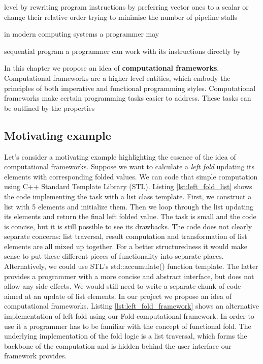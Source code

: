 level by rewriting program instructions by preferring vector ones to a scalar or change their relative order trying to minimise the number of pipeline stalls    

in modern computing systems a programmer may 

sequential program a programmer can work with its instructions directly by 

\quad In this chapter we propose an idea of \textbf{computational frameworks}. Computational frameworks are a higher level entities, which embody the principles of both imperative and functional programming styles. Computational frameworks make certain programming tasks easier to address. These tasks can be outlined by the properties 

\subsection{Motivating example}
\quad Let's consider a motivating example highlighting the essence of the idea of computational frameworks. Suppose we want to calculate a \textit{left fold} updating its elements with corresponding folded values.\newline\null
\quad We can code that simple computation using C++ Standard Template Library (STL). Listing \ref{lst:left_fold_list} shows the code implementing the task with a list class template. First, we construct a list with 5 elements and initialize them. Then we loop through the list updating its elements and return the final left folded value. The task is small and the code is concise, but it is still possible to see its drawbacks. The code does not clearly separate concerns: list traversal, result computation and transformation of list elements are all mixed up together. For a better structuredness it would make sense to put these different pieces of functionality into separate places. Alternatively, we could use STL's std::accumulate() function template. The latter provides a programmer with a more concise and abstract interface, but does not allow any side effects. We would still need to write a separate chunk of code aimed at an update of list elements.\newline\null 
\quad In our project we propose an idea of computational frameworks. Listing \ref{lst:left_fold_framework} shows an alternative implementation of left fold using our Fold computational framework. In order to use it a programmer has to be familiar with the concept of functional fold. The underlying implementation of the fold logic is a list traversal, which forms the backbone of the computation and is hidden behind the user interface our framework provides. 

